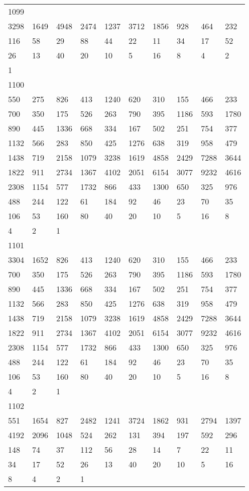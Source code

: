 \begin{longtable}{*{10}{l}}
1099&&&&&&&&&\\
3298& 1649& 4948& 2474& 1237& 3712& 1856& 928& 464& 232\\
116& 58& 29& 88& 44& 22& 11& 34& 17& 52\\
26& 13& 40& 20& 10& 5& 16& 8& 4& 2\\
1& \\

1100&&&&&&&&&\\
550& 275& 826& 413& 1240& 620& 310& 155& 466& 233\\
700& 350& 175& 526& 263& 790& 395& 1186& 593& 1780\\
890& 445& 1336& 668& 334& 167& 502& 251& 754& 377\\
1132& 566& 283& 850& 425& 1276& 638& 319& 958& 479\\
1438& 719& 2158& 1079& 3238& 1619& 4858& 2429& 7288& 3644\\
1822& 911& 2734& 1367& 4102& 2051& 6154& 3077& 9232& 4616\\
2308& 1154& 577& 1732& 866& 433& 1300& 650& 325& 976\\
488& 244& 122& 61& 184& 92& 46& 23& 70& 35\\
106& 53& 160& 80& 40& 20& 10& 5& 16& 8\\
4& 2& 1& \\

1101&&&&&&&&&\\
3304& 1652& 826& 413& 1240& 620& 310& 155& 466& 233\\
700& 350& 175& 526& 263& 790& 395& 1186& 593& 1780\\
890& 445& 1336& 668& 334& 167& 502& 251& 754& 377\\
1132& 566& 283& 850& 425& 1276& 638& 319& 958& 479\\
1438& 719& 2158& 1079& 3238& 1619& 4858& 2429& 7288& 3644\\
1822& 911& 2734& 1367& 4102& 2051& 6154& 3077& 9232& 4616\\
2308& 1154& 577& 1732& 866& 433& 1300& 650& 325& 976\\
488& 244& 122& 61& 184& 92& 46& 23& 70& 35\\
106& 53& 160& 80& 40& 20& 10& 5& 16& 8\\
4& 2& 1& \\

1102&&&&&&&&&\\
551& 1654& 827& 2482& 1241& 3724& 1862& 931& 2794& 1397\\
4192& 2096& 1048& 524& 262& 131& 394& 197& 592& 296\\
148& 74& 37& 112& 56& 28& 14& 7& 22& 11\\
34& 17& 52& 26& 13& 40& 20& 10& 5& 16\\
8& 4& 2& 1& \\


\end{longtable}
